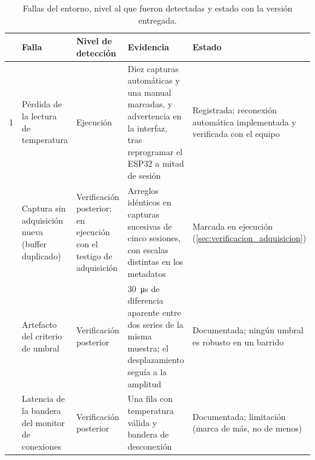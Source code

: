 \begin{table}[H]
  \centering
  \caption{Fallas del entorno, nivel al que fueron detectadas y estado
           con la versión entregada.}
  \label{tab:fallas_entorno}
  \footnotesize
  \begin{tabular}{p{0.4cm}>{\raggedright\arraybackslash}p{3.3cm}>{\raggedright\arraybackslash}p{2.4cm}>{\raggedright\arraybackslash}p{4.0cm}>{\raggedright\arraybackslash}p{3.2cm}}
    \toprule
    & \textbf{Falla} & \textbf{Nivel de detección} &
    \textbf{Evidencia} & \textbf{Estado} \\
    \midrule
    1 & Pérdida de la lectura de temperatura & Ejecución &
    Diez capturas automáticas y una manual marcadas, y advertencia en la interfaz,
    tras reprogramar el ESP32 a mitad de sesión &
    Registrada; reconexión automática implementada y verificada con el
    equipo \\
    \addlinespace[2pt]
    4 & Captura sin adquisición nueva (buffer duplicado) &
    Verificación posterior; en ejecución con el testigo de adquisición &
    Arreglos idénticos en capturas sucesivas de cinco sesiones, con
    escalas distintas en los metadatos &
    Marcada en ejecución (\cref{sec:verificacion_adquisicion}) \\
    \addlinespace[2pt]
    6 & Artefacto del criterio de umbral & Verificación posterior &
    \SI{30}{\micro\second} de diferencia aparente entre dos series de la
    misma muestra; el desplazamiento seguía a la amplitud &
    Documentada; ningún umbral es robusto en un barrido \\
    \addlinespace[2pt]
    12 & Latencia de la bandera del monitor de conexiones &
    Verificación posterior &
    Una fila con temperatura válida y bandera de desconexión &
    Documentada; limitación (marca de más, no de menos) \\
    \bottomrule
  \end{tabular}
\end{table}

